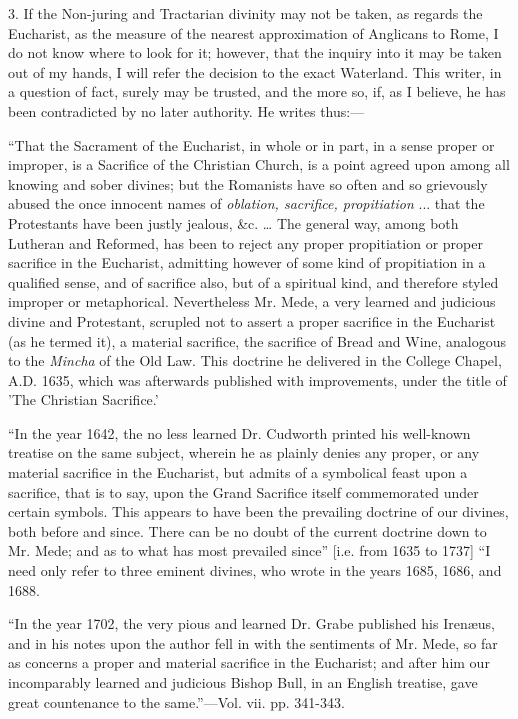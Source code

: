 3. If the Non-juring and Tractarian divinity may not be taken, as
regards the Eucharist, as the measure of the nearest approximation of
Anglicans to Rome, I do not know where to look for it; however, that
the inquiry into it may be taken out of my hands, I will refer the
decision to the exact Waterland. This writer, in a question of fact,
surely may be trusted, and the more so, if, as I believe, he has been
contradicted by no later authority. He writes thus:—

``That the Sacrament of the Eucharist, in whole or in part, in
a sense proper or improper, is a Sacrifice of the Christian Church, is
a point agreed upon among all knowing and sober divines; but the
Romanists have so often and so grievously abused the once innocent
names of \emph{oblation, sacrifice, propitiation} ... that the
Protestants have been justly jealous, \&c. … The general way,
among both Lutheran and Reformed, has been to reject any proper
propitiation or proper sacrifice in the Eucharist, admitting however
of some kind of propitiation in a qualified sense, and of sacrifice
also, but of a spiritual kind, and therefore styled improper or
metaphorical. Nevertheless Mr. Mede, a very learned and judicious
divine and Protestant, scrupled not to assert a proper sacrifice in
the Eucharist (as he termed it), a material sacrifice, the sacrifice
of Bread and Wine, analogous to the \emph{Mincha} of the Old Law. This
doctrine he delivered in the College Chapel, A.D. 1635, which was
afterwards published with improvements, under the title of 'The
Christian Sacrifice.'

``In the year 1642, the no less learned Dr. Cudworth printed
his well-known treatise on the same subject, wherein he as plainly
denies any proper, or any material sacrifice in the Eucharist, but
admits of a symbolical feast upon a sacrifice, that is to say, upon
the Grand Sacrifice itself commemorated under certain symbols. This
appears to have been the prevailing doctrine of our divines, both
before and since. There can be no doubt of the current doctrine down
to Mr. Mede; and as to what has most prevailed since'' [i.e. from
1635 to 1737] ``I need only refer to three eminent divines, who
wrote in the years 1685, 1686, and 1688.

``In the year 1702, the very pious and learned Dr. Grabe
published his Irenæus, and in his notes upon the author fell in with
the sentiments of Mr. Mede, so far as concerns a proper and material
sacrifice in the Eucharist; and after him our incomparably learned and
judicious Bishop Bull, in an English treatise, gave great countenance
to the same.''—Vol. vii. pp. 341-343.

